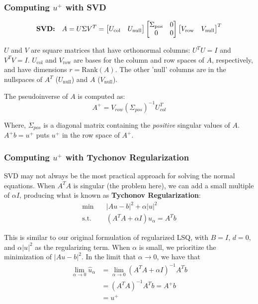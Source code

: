 \documentclass[]{article}
\newcommand{\norm}[1]{\lvert #1 \rvert}
\begin{document}
\subsubsection{Computing $u^{+}$ with SVD}

\begin{equation}
\textrm{\textbf{SVD:}} \quad A = U\Sigma V^T = \begin{bmatrix}
U_{\textrm{col}} & U_{\textrm{null}}
\end{bmatrix} \begin{bmatrix}
\Sigma_{\textrm{pos}} & 0 \\ 0 & 0
\end{bmatrix} \begin{bmatrix}
V_{\textrm{row}} & V_{\textrm{null}}
\end{bmatrix}^{T}
\end{equation}

$U$ and $V$ are square matrices that have orthonormal columns: $U^{T}U = I$ and $V^{T}V = I$. $U_{\textrm{col}}$ and $V_{\textrm{row}}$ are bases for the column and row spaces of $A$, respectively, and have dimensions $r = \textrm{Rank}(A)$. The other 'null' columns are in the nullspaces of $A^T$ ($U_{\textrm{null}}$) and $A$ ($V_{\textrm{null}}$). 

The pseudoinverse of $A$ is computed as:
\begin{equation}
A^{+} = V_{row}(\Sigma_{pos})^{-1}U_{col}^{T}
\end{equation}

Where, $\Sigma_{pos}$ is a diagonal matrix containing the \textit{positive} singular values of $A$. $A^{+}b = u^{+}$ puts $u^{+}$ in the row space of $A^{+}$. 

\subsubsection{Computing $u^{+}$ with Tychonov Regularization}
SVD may not always be the most practical approach for solving the normal equations. When $A^{T}A$ is singular (the problem here), we can add a small multiple of $\alpha I$, producing what is known as \textbf{Tychonov Regularization}:
\begin{align}
\min &\quad \norm{Au-b}^{2} + \alpha \norm{u}^{2} \\
\textrm{s.t.} &\quad (A^{T}A + \alpha I)\hat{u}_{\alpha} = A^{T}b \nonumber 
\end{align}

This is similar to our original formulation of regularized LSQ, with $B = I$, $d=0$, and $\alpha \norm{u}^{2}$ as the regularizing term. When $\alpha$ is small, we prioritize the minimization of $\norm{Au-b}^{2}$. In the limit that $\alpha \rightarrow 0$, we have that 
\begin{align*}
\lim\limits_{\alpha \rightarrow 0} \hat{u}_{\alpha} &= \lim\limits_{\alpha \rightarrow 0} (A^{T}A + \alpha I)^{-1} A^{T}b \\
&= (A^{T}A)^{-1}A^{T}b = A^{+}b \\
&= u^{+} 
\end{align*}
\end{document}
